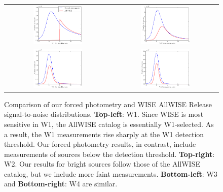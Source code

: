 \documentclass[12pt,preprint]{aastex}
\begin{document}
\begin{figure}
\begin{center}
\begin{tabular}{@{}c@{}c@{}}
  \includegraphics[width=0.48\textwidth]{density-04} &
  \includegraphics[width=0.48\textwidth]{density-05} \\
  \includegraphics[width=0.48\textwidth]{density-06} &
  \includegraphics[width=0.48\textwidth]{density-07}
\end{tabular}
\end{center}
\caption{Comparison of our forced photometry and WISE
  AllWISE Release signal-to-noise distributions.  \textbf{Top-left}:
  W1.  Since WISE is most sensitive in W1, the AllWISE catalog is
  essentially W1-selected.  As a result, the W1 measurements rise
  sharply at the W1 detection threshold.  Our forced photometry
  results, in contrast, include measurements of sources below the
  detection threshold.  \textbf{Top-right}: W2.  Our results for
  bright sources follow those of the AllWISE catalog, but we include
  more faint measurements.  \textbf{Bottom-left}: W3 and
  \textbf{Bottom-right}: W4 are similar.
  \label{fig:snhists}}
\end{figure}
\end{document}
